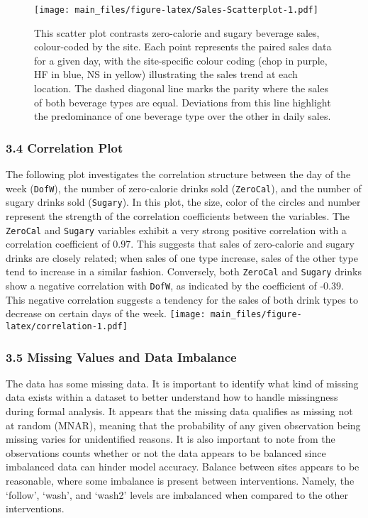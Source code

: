 \documentclass[
]{article}
\begin{document}
\begin{figure}
\centering
\texttt{[image: main\_files/figure-latex/Sales-Scatterplot-1.pdf]}
\caption{This scatter plot contrasts zero-calorie and sugary beverage
sales, colour-coded by the site. Each point represents the paired sales
data for a given day, with the site-specific colour coding (chop in
purple, HF in blue, NS in yellow) illustrating the sales trend at each
location. The dashed diagonal line marks the parity where the sales of
both beverage types are equal. Deviations from this line highlight the
predominance of one beverage type over the other in daily sales.}
\end{figure}

\hypertarget{correlation-plot}{%
\subsubsection{3.4 Correlation Plot}\label{correlation-plot}}

The following plot investigates the correlation structure between the
day of the week (\texttt{DofW}), the number of zero-calorie drinks sold
(\texttt{ZeroCal}), and the number of sugary drinks sold
(\texttt{Sugary}). In this plot, the size, color of the circles and
number represent the strength of the correlation coefficients between
the variables. The \texttt{ZeroCal} and \texttt{Sugary} variables
exhibit a very strong positive correlation with a correlation
coefficient of 0.97. This suggests that sales of zero-calorie and sugary
drinks are closely related; when sales of one type increase, sales of
the other type tend to increase in a similar fashion. Conversely, both
\texttt{ZeroCal} and \texttt{Sugary} drinks show a negative correlation
with \texttt{DofW}, as indicated by the coefficient of -0.39. This
negative correlation suggests a tendency for the sales of both drink
types to decrease on certain days of the week.
\texttt{[image: main\_files/figure-latex/correlation-1.pdf]}

\hypertarget{missing-values-and-data-imbalance}{%
\subsubsection{3.5 Missing Values and Data
Imbalance}\label{missing-values-and-data-imbalance}}

The data has some missing data. It is important to identify what kind of
missing data exists within a dataset to better understand how to handle
missingness during formal analysis. It appears that the missing data
qualifies as missing not at random (MNAR), meaning that the probability
of any given observation being missing varies for unidentified reasons.
It is also important to note from the observations counts whether or not
the data appears to be balanced since imbalanced data can hinder model
accuracy. Balance between sites appears to be reasonable, where some
imbalance is present between interventions. Namely, the `follow',
`wash', and `wash2' levels are imbalanced when compared to the other
interventions.
\end{document}
